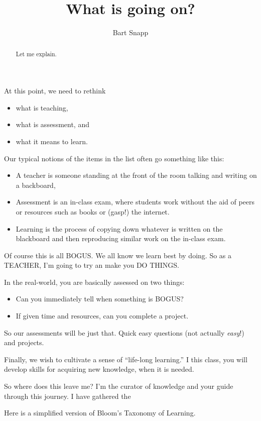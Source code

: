 \documentclass{ximera}
\author{Bart Snapp}
\title{What is going on?}
\begin{document}
\begin{abstract}
  Let me explain. 
\end{abstract}
\maketitle

At this point, we need to rethink
\begin{itemize}
\item what is teaching,
\item what is assessment, and
\item what it means to learn.
\end{itemize}
Our typical notions of the items in the list often go something like
this:
\begin{itemize}
\item A teacher is someone standing at the front of the room talking
  and writing on a backboard,
\item Assessment is an in-class exam, where students work without the
  aid of peers or resources such as books or (gasp!) the internet.
\item Learning is the process of copying down whatever is written on
  the blackboard and then reproducing similar work on the in-class
  exam.
\end{itemize}

Of course this is all BOGUS. We all know we learn best by doing.
So as a TEACHER, I'm going to try an make you DO THINGS.

In the real-world, you are basically assessed on two things:
\begin{itemize}
\item Can you immediately tell when something is BOGUS?
\item If given time and resources, can you complete a project.
\end{itemize}

So our assessments will be just that. Quick easy questions (not
actually \textit{easy}!) and projects.

Finally, we wish to cultivate a sense of ``life-long learning.''  I
this class, you will develop skills for acquiring new knowledge, when
it is needed.



So where does this leave me? I'm the curator of knowledge and your
guide through this journey. I have gathered the



Here is a simplified version of Bloom's Taxonomy of Learning.
\end{document}

